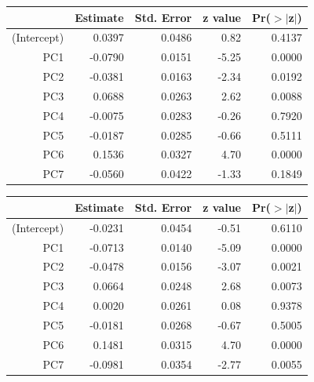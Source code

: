 \documentclass[a4paper,12pt]{Latex/Classes/PhDthesisPSnPDF}
\begin{document}
\begin{center}
\begin{table}[ht]
\centering
\begin{tabular}{rrrrr}
  \hline
 & Estimate & Std. Error & z value & Pr($>$$|$z$|$) \\ 
  \hline
(Intercept) & 0.0397 & 0.0486 & 0.82 & 0.4137 \\ 
  PC1 & -0.0790 & 0.0151 & -5.25 & 0.0000 \\ 
  PC2 & -0.0381 & 0.0163 & -2.34 & 0.0192 \\ 
  PC3 & 0.0688 & 0.0263 & 2.62 & 0.0088 \\ 
  PC4 & -0.0075 & 0.0283 & -0.26 & 0.7920 \\ 
  PC5 & -0.0187 & 0.0285 & -0.66 & 0.5111 \\ 
  PC6 & 0.1536 & 0.0327 & 4.70 & 0.0000 \\ 
  PC7 & -0.0560 & 0.0422 & -1.33 & 0.1849 \\ 
   \hline
\end{tabular}
\end{table}\end{center}
\newpage
\begin{center}
\begin{table}[ht]
\centering
\begin{tabular}{rrrrr}
  \hline
 & Estimate & Std. Error & z value & Pr($>$$|$z$|$) \\ 
  \hline
(Intercept) & -0.0231 & 0.0454 & -0.51 & 0.6110 \\ 
  PC1 & -0.0713 & 0.0140 & -5.09 & 0.0000 \\ 
  PC2 & -0.0478 & 0.0156 & -3.07 & 0.0021 \\ 
  PC3 & 0.0664 & 0.0248 & 2.68 & 0.0073 \\ 
  PC4 & 0.0020 & 0.0261 & 0.08 & 0.9378 \\ 
  PC5 & -0.0181 & 0.0268 & -0.67 & 0.5005 \\ 
  PC6 & 0.1481 & 0.0315 & 4.70 & 0.0000 \\ 
  PC7 & -0.0981 & 0.0354 & -2.77 & 0.0055 \\ 
   \hline
\end{tabular}
\end{table}\end{center}
\end{document}
